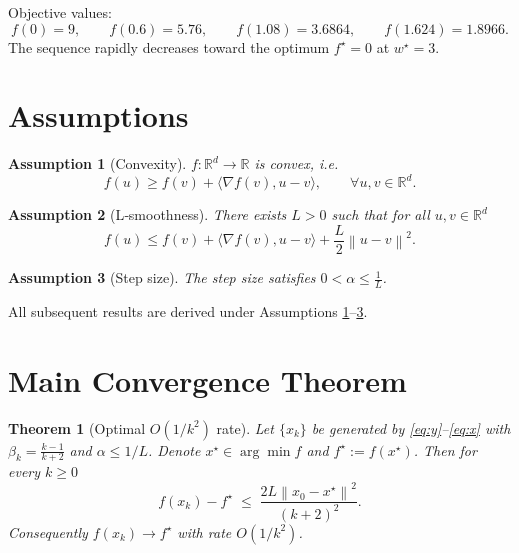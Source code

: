\documentclass{article}
\newtheorem{theorem}{Theorem}
\newtheorem{assumption}{Assumption}
\newcommand{\R}{\mathbb{R}}
\newcommand{\norm}[1]{\left\|#1\right\|}
\newcommand{\grad}{\nabla}
\begin{document}
Objective values:
\[
f(0)=9,\qquad f(0.6)=5.76,\qquad f(1.08)=3.6864,\qquad f(1.624)=1.8966.
\]
The sequence rapidly decreases toward the optimum $f^\star=0$ at $w^\star=3$.

\newpage
\section*{Assumptions}
\begin{assumption}[Convexity]\label{ass:convex}
$f:\R^d\to\R$ is convex, i.e.
\[
f(u)\ge f(v)+\langle\grad f(v),u-v\rangle,\qquad\forall u,v\in\R^d .
\]
\end{assumption}
\begin{assumption}[L‑smoothness]\label{ass:smooth}
There exists $L>0$ such that for all $u,v\in\R^d$
\[
f(u)\le f(v)+\langle\grad f(v),u-v\rangle+\frac{L}{2}\norm{u-v}^2 .
\]
\end{assumption}
\begin{assumption}[Step size]\label{ass:step}
The step size satisfies $0<\alpha\le \tfrac1L$.
\end{assumption}
All subsequent results are derived under Assumptions \ref{ass:convex}–\ref{ass:step}.

\section*{Main Convergence Theorem}
\begin{theorem}[Optimal $O(1/k^2)$ rate]\label{thm:rate}
Let $\{x_k\}$ be generated by \eqref{eq:y}–\eqref{eq:x} with $\beta_k=\frac{k-1}{k+2}$ and $\alpha\le 1/L$.  
Denote $x^\star\in\arg\min f$ and $f^\star:=f(x^\star)$. Then for every $k\ge 0$
\[
f(x_k)-f^\star\;\le\;\frac{2L\norm{x_0-x^\star}^2}{(k+2)^2}.
\]
Consequently $f(x_k)\to f^\star$ with rate $O(1/k^2)$.
\end{theorem}
\end{document}
